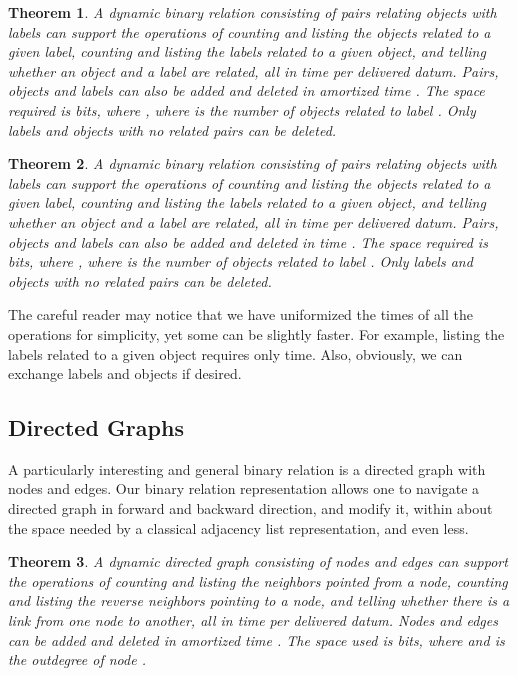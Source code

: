 \documentclass[11pt]{article}
\newtheorem{theorem}{Theorem}
\begin{document}
\begin{theorem} \label{thm:binrel}
A dynamic binary relation consisting of  pairs relating  objects 
with  labels can support the operations of 
counting and listing the objects 
related to a given label, counting and listing the labels related to a given 
object, and telling whether an object and a label are related, all in time 
 per delivered datum. Pairs, objects 
and labels can also be added and deleted in amortized time 
. The space required is 
 bits,
where , where  is the number of objects related to label .
Only labels and objects with no related pairs can be deleted.
\end{theorem}

\begin{theorem} \label{thm:binrelwc}
A dynamic binary relation consisting of  pairs relating  objects 
with  labels can support the operations of 
counting and listing the objects 
related to a given label, counting and listing the labels related to a given 
object, and telling whether an object and a label are related, all in time 
 per delivered datum. Pairs, objects 
and labels can also be added and deleted in time 
. The space required is 
 bits,
where , where  is the number of objects related to label .
Only labels and objects with no related pairs can be deleted.
\end{theorem}

The careful reader may notice that we have uniformized the times of all the
operations for simplicity, yet some can be slightly faster. For example,
listing the  labels related to a given object requires only
 time. Also, obviously, we can
exchange labels and objects if desired.

\subsection{Directed Graphs} 

A particularly interesting and general binary
relation is a directed graph with  nodes and  edges. Our binary relation
representation allows one to navigate a directed graph in forward and backward 
direction, and modify it, within about the space needed by a classical
adjacency list representation, and even less.

\begin{theorem}
A dynamic directed graph consisting of  nodes and  edges 
can support the operations of counting and listing the neighbors pointed from 
a node, counting and listing the reverse neighbors pointing to a node, and 
telling whether there is a link from one node to another, all in time 
 per delivered datum. Nodes and edges 
can be added and deleted in amortized time 
. The space used is 
 bits, 
where 
and  is the outdegree of node .
\end{theorem}
\end{document}
